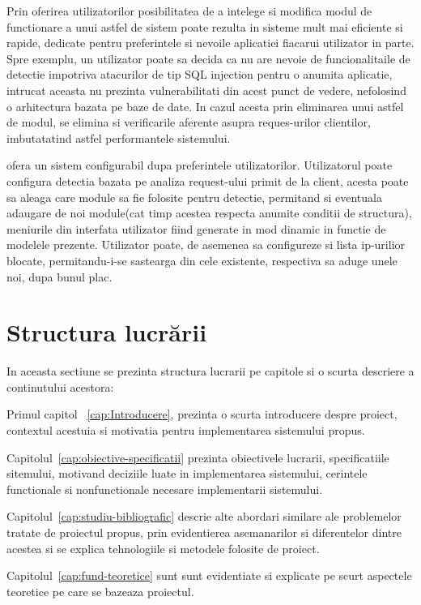 Prin oferirea utilizatorilor posibilitatea de a intelege si modifica modul de functionare a unui astfel de sistem poate rezulta in sisteme mult mai eficiente si rapide, dedicate pentru preferintele si nevoile aplicatiei fiacarui utilizator in parte. Spre exemplu, un utilizator poate sa decida ca nu are nevoie de funcionalitaile de detectie impotriva atacurilor de tip SQL injection pentru o anumita aplicatie, intrucat aceasta nu prezinta vulnerabilitati din acest punct de vedere, nefolosind o arhitectura bazata pe baze de date. In cazul acesta prin eliminarea unui astfel de modul, se elimina si verificarile aferente asupra reques-urilor clientilor, imbutatatind astfel performantele sistemului.

\textit{\thesistitle} ofera un sistem configurabil dupa preferintele utilizatorilor. Utilizatorul poate configura detectia bazata pe analiza request-ului primit de la client, acesta poate sa aleaga  care module sa fie folosite pentru detectie, permitand si eventuala adaugare de noi module(cat timp acestea respecta anumite conditii de structura), meniurile din interfata utilizator fiind generate in mod dinamic in functie de modelele prezente. Utilizator poate, de asemenea sa configureze si lista ip-urilior blocate, permitandu-i-se sastearga din cele existente, respectiva sa aduge unele noi, dupa bunul plac.



 \section{Structura lucrării}
In aceasta sectiune se prezinta structura lucrarii pe capitole si o scurta descriere a continutului acestora:

Primul capitol ~\ref{cap:Introducere}, prezinta o scurta introducere despre proiect, contextul acestuia si motivatia pentru implementarea sistemului propus.

Capitolul~\ref{cap:obiective-specificatii} prezinta obiectivele lucrarii, specificatiile sitemului, motivand deciziile luate in implementarea sistemului, cerintele functionale si nonfunctionale necesare implementarii sistemului.

 Capitolul~\ref{cap:studiu-bibliografic} descrie alte abordari similare ale problemelor tratate de proiectul propus, prin evidentierea asemanarilor si diferentelor dintre acestea si se explica tehnologiile si metodele folosite de proiect.
 
Capitolul~\ref{cap:fund-teoretice} sunt  sunt evidentiate si explicate pe scurt aspectele teoretice pe care se bazeaza proiectul.

